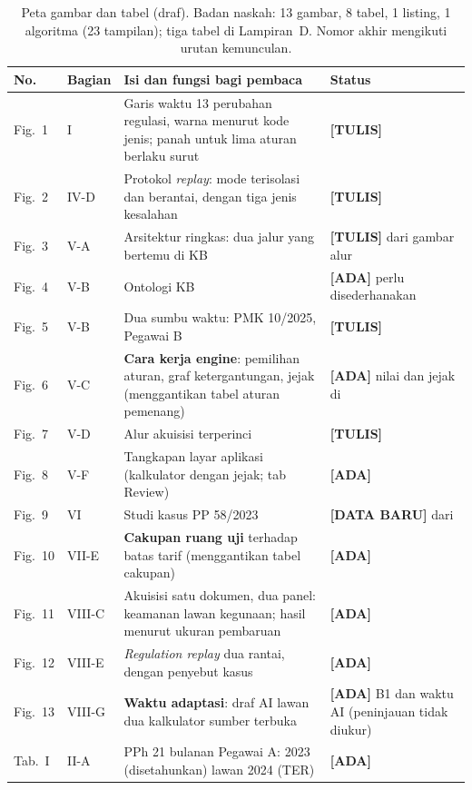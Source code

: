 \documentclass{ieeeaccess}
\newcommand{\ADA}{\textcolor{stada}{\textbf{[ADA]}}}
\newcommand{\TULIS}{\textcolor{sttulis}{\textbf{[TULIS]}}}
\newcommand{\BARU}{\textcolor{stbaru}{\textbf{[DATA BARU]}}}
\begin{document}
\begin{table}[!t]
\caption{Peta gambar dan tabel (draf). Badan naskah: 13 gambar, 8 tabel, 1 listing, 1 algoritma (23 tampilan); tiga tabel di Lampiran~D. Nomor akhir mengikuti urutan kemunculan.}
\label{tab:peta}
\footnotesize
\begin{tabularx}{\textwidth}{@{}P{0.9cm} P{1.1cm} L P{3.2cm}@{}}
\toprule
\textbf{No.} & \textbf{Bagian} & \textbf{Isi dan fungsi bagi pembaca} & \textbf{Status} \\
\midrule
Fig.~1 & I & Garis waktu 13 perubahan regulasi, warna menurut kode jenis; panah untuk lima aturan berlaku surut & \TULIS{}  \\
Fig.~2 & IV-D & Protokol \textit{replay}: mode terisolasi dan berantai, dengan tiga jenis kesalahan & \TULIS{} \\
Fig.~3 & V-A & Arsitektur ringkas: dua jalur yang bertemu di KB & \TULIS{} dari gambar alur \\
Fig.~4 & V-B & Ontologi KB & \ADA{} perlu disederhanakan \\
Fig.~5 & V-B & Dua sumbu waktu: PMK 10/2025, Pegawai B & \TULIS{} \\
Fig.~6 & V-C & \textbf{Cara kerja engine}: pemilihan aturan, graf ketergantungan, jejak (menggantikan tabel aturan pemenang) & \ADA{} nilai dan jejak di  \\
Fig.~7 & V-D & Alur akuisisi terperinci & \TULIS{} \\
Fig.~8 & V-F & Tangkapan layar aplikasi (kalkulator dengan jejak; tab Review) & \ADA{}  \\
Fig.~9 & VI & Studi kasus PP 58/2023 & \BARU{} dari  \\
Fig.~10 & VII-E & \textbf{Cakupan ruang uji} terhadap batas tarif (menggantikan tabel cakupan) & \ADA{}  \\
Fig.~11 & VIII-C & Akuisisi satu dokumen, dua panel: keamanan lawan kegunaan; hasil menurut ukuran pembaruan & \ADA{} \\
Fig.~12 & VIII-E & \textit{Regulation replay} dua rantai, dengan penyebut kasus & \ADA{}  \\
Fig.~13 & VIII-G & \textbf{Waktu adaptasi}: draf AI lawan dua kalkulator sumber terbuka & \ADA{} B1 dan waktu AI (peninjauan tidak diukur) \\
\midrule
Tab.~I & II-A & PPh 21 bulanan Pegawai A: 2023 (disetahunkan) lawan 2024 (TER) & \ADA{}  \\

\end{tabularx}
\end{table}
\end{document}
